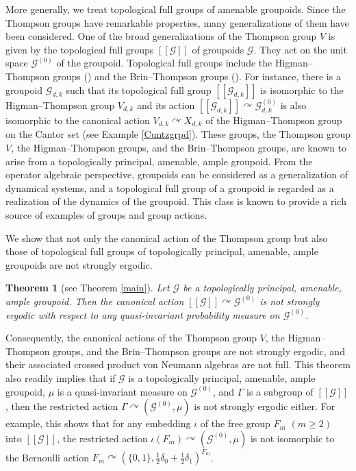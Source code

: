 \documentclass{amsart}
\newcommand{\G}{\mathcal{G}}
\newtheorem*{maintheorem}{Theorem}
\theoremstyle{remark}
\theoremstyle{definition}
\begin{document}
More generally, we treat topological full groups of amenable groupoids.
Since the Thompson groups have remarkable properties, many generalizations of them have been considered.
One of the broad generalizations of the Thompson group $V$ is given by the topological full groups $[[ \mathcal{G} ]]$ of groupoids $\mathcal{G}$.
They act on the unit space $\mathcal{G}^{(0)}$ of the groupoid. 
Topological full groups include the Higman--Thompson groups (\cite{Higman}) and the Brin--Thompson groups (\cite{Brin}).
For instance, there is a groupoid $\mathcal{G}_{d, k}$ such that its topological full group $[[ \mathcal{G}_{d, k} ]]$ is isomorphic to the Higman--Thompson group $V_{d, k}$ and its action $[[ \mathcal{G} _{d, k} ]] \curvearrowright \mathcal{G}^{(0)}_{d, k}$ is also isomorphic to the canonical action $V_{d, k} \curvearrowright X_{d, k}$ of the Higman--Thompson group on the Cantor set (see Example \ref{Cuntzgrpd}).
These groups, the Thompson group $V$, the Higman--Thompson groups, and the Brin--Thompson groups, are known to arise from a topologically principal, amenable, ample groupoid.
From the operator algebraic perspective, groupoids can be considered as a generalization of dynamical systems, and a topological full group of a groupoid is regarded as a realization of the dynamics of the groupoid.
This class is known to provide a rich source of examples of groups and group actions.

We show that not only the canonical action of the Thompson group but also those of topological full groups of topologically principal, amenable, ample groupoids are not strongly ergodic.

\begin{maintheorem}[see Theorem \ref{main}]
Let $\mathcal{G}$ be a topologically principal, amenable, ample groupoid.
Then the canonical action $[[ \mathcal{G} ]] \curvearrowright \mathcal{G}^{(0)}$ is not strongly ergodic with respect to any quasi-invariant probability measure on $\mathcal{G}^{(0)}$. 
\end{maintheorem}

Consequently, the canonical actions of the Thompson group $V$, the Higman--Thompson groups, and the Brin--Thompson groups are not strongly ergodic, and their associated crossed product von Neumann algebras are not full.
This theorem also readily implies that if $\G$ is a topologically principal, amenable, ample groupoid, $\mu$ is a quasi-invariant measure on $\G^{(0)}$, and $\Gamma$ is a subgroup of $[[ \G ]]$, then the restricted action $\Gamma \curvearrowright (\G^{(0)}, \mu)$ is not strongly ergodic either.
For example, this shows that for any embedding $\iota$ of the free group $F_m$ $(m \geq 2)$ into $[[ \G ]]$, the restricted action $\iota (F_m) \curvearrowright (\G^{(0)}, \mu)$ is not isomorphic to the Bernoulli action $F_m \curvearrowright (\{ 0, 1 \} , \frac{1}{2}\delta _0 + \frac{1}{2}\delta _1)^{F_m}$.
\end{document}
